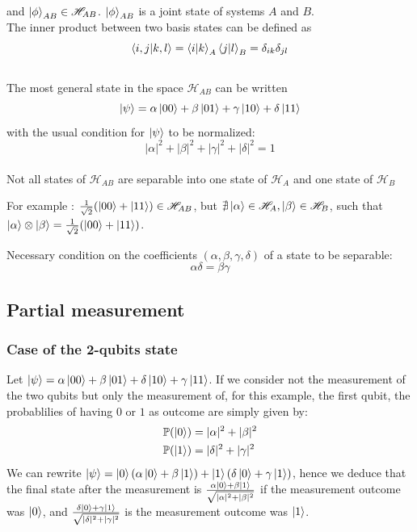 \documentclass{article}
\begin{document}
and $\ket{\phi}_{AB} \in \mathscr{H}_{AB}$. $\ket{\phi}_{AB}$ is a joint state
of systems $A$ and $B$. \\\noindent The inner product between two basis states
can be defined as
\begin{equation}
    \braket{i,j|k,l}=\braket{i|k}_A\braket{j|l}_B = \delta_{ik}\delta_{jl}
\end{equation}
\\\noindent The most general state in the space $\mathscr{H}_{AB}$ can be
written
\begin{equation}
    \ket{\psi} = \alpha \ket{00} + \beta \ket{01} + \gamma \ket{10} + \delta \ket{11}
\end{equation}
with the usual condition for $\ket{\psi}$ to be normalized:
\begin{equation}
    |\alpha|^2+|\beta|^2+|\gamma|^2+|\delta|^2 = 1
\end{equation}
\\\noindent Not all states of $\mathscr{H}_{AB}$ are separable into one state of
$\mathscr{H}_{A}$ and one state of $\mathscr{H}_{B}$

For example : $\frac{1}{\sqrt{2}}(\ket{00} + \ket{11}) \in \mathscr{H}_{AB}$,
but $\nexists \ket{\alpha}\in \mathscr{H}_A, \ket{\beta}\in \mathscr{H}_B$, such
that \\\noindent $\ket{\alpha}\otimes\ket{\beta} = \frac{1}{\sqrt{2}}(\ket{00} +
\ket{11})$.

Necessary condition on the coefficients $(\alpha, \beta, \gamma, \delta)$ of a
state to be separable:
\begin{equation}
    \alpha\delta = \beta\gamma
\end{equation}

\subsection{Partial measurement}
\subsubsection*{Case of the 2-qubits state}
Let $\ket{\psi} = \alpha \ket{00} + \beta \ket{01} + \delta \ket{10} + \gamma
\ket{11}$. If we consider not the measurement of the two qubits but only the
measurement of, for this example, the first qubit, the probablilies of having
$0$ or $1$ as outcome are simply given by:
\begin{equation}
    \begin{aligned}
        \mathbb{P}(\ket{0}) & = |\alpha|^2 + |\beta|^2 \\
        \mathbb{P}(\ket{1}) & = |\delta|^2 + |\gamma|^2
    \end{aligned}
\end{equation}
We can rewrite $\ket{\psi} = \ket{0}(\alpha \ket{0} + \beta \ket{1}) +
\ket{1}(\delta \ket{0} + \gamma \ket{1})$, hence we deduce that the final state
after the measurement is $\frac{\alpha \ket{0} + \beta \ket{1}}{\sqrt{|\alpha|^2
+ |\beta|^2}}$ if the measurement outcome was $\ket{0}$, and
$\frac{\delta \ket{0} + \gamma \ket{1}}{\sqrt{ |\delta|^2 +
|\gamma|^2}}$ is the measurement outcome was $\ket{1}$.
\end{document}
